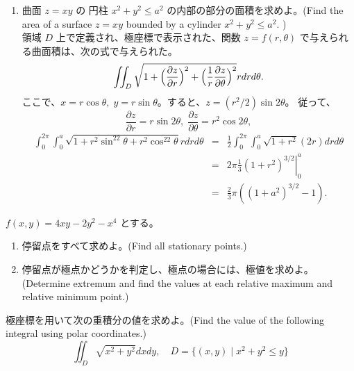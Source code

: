 \begin{enumerate}
\item 曲面 $z = xy$ の 円柱 $x^2 + y^2 \leq a^2$  の内部の部分の面積を求めよ。(Find the area of a surface $z = xy$ bounded by a cylinder $x^2 + y^2 \leq a^2$. )\\
\sol
領域 $D$ 上で定義され、極座標で表示された、関数 $z=f(r,\theta)$ で与えられる曲面積は、次の式で与えられた。
$$\iint_D\sqrt{1+\Bigl(\frac{\partial z}{\partial r}\Bigr)^2 + \Bigl(\frac{1}{r}\frac{\partial z}{\partial \theta}\Bigr)^2}rdrd\theta.$$
ここで、$x = r\cos\theta, \;y = r\sin\theta$。すると、$z = (r^2/2)\sin2\theta$。
従って、
$$\frac{\partial z}{\partial r} = r\sin2\theta,\;\frac{\partial z}{\partial \theta} = r^2\cos2\theta,$$
\begin{eqnarray*}
\int_0^{2\pi}\int_0^a\sqrt{1+r^2\sin^22\theta + r^2\cos^22\theta}rdrd\theta
& = & \frac12\int_0^{2\pi}\int_0^a\sqrt{1+r^2}(2r)drd\theta\\
& = & 2\pi\left.\frac{1}{3}(1+r^2)^{3/2}\right|_0^a\\
& = & \frac23\pi((1+a^2)^{3/2} - 1).
\end{eqnarray*}
\end{enumerate}
    



\item $f(x,y) = 4xy - 2y^2 - x^4$ とする。
\begin{enumerate}
\item 停留点をすべて求めよ。(Find all stationary points.)
\item 停留点が極点かどうかを判定し、極点の場合には、極値を求めよ。(Determine extremum and find the values at each relative maximum and relative minimum point.)
\end{enumerate}

\item 極座標を用いて次の重積分の値を求めよ。(Find the value of the following integral using polar coordinates.)
$$\iint_D\sqrt{x^2+y^2}dxdy,\quad D = \{(x,y)\mid x^2 + y^2 \leq y\}$$

